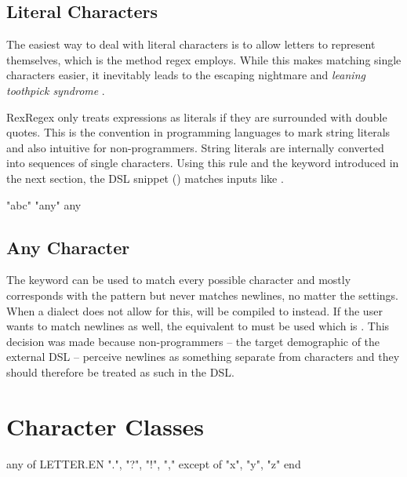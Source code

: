 \subsection{Literal Characters}

The easiest way to deal with literal characters is to allow letters to represent themselves, which is the method regex employs. While this makes matching single characters easier, it inevitably leads to the escaping nightmare and \emph{leaning toothpick syndrome} \cite{LeaningToothpick}. 

RexRegex only treats expressions as literals if they are surrounded with double quotes. This is the convention in programming languages to mark string literals and also intuitive for non-programmers. String literals are internally converted into sequences of single characters. Using this rule and the  keyword introduced in the next section, the DSL snippet () matches inputs like .

\vspace{5mm}
\begin{rexregexBox}[title={Literal characters in RexRegex},label=code:dslLiteralChars,width=9.5cm,center]
"abc"
"any"
any
\end{rexregexBox}

\subsection{Any Character}

The  keyword can be used to match every possible character and mostly corresponds with the  pattern but never matches newlines, no matter the settings. When a dialect does not allow for this,  will be compiled to \pattern{[\caret\bs n]} instead. If the user wants to match newlines as well, the equivalent to  must be used which is . This decision was made because non-programmers -- the target demographic of the external DSL -- perceive newlines as something separate from characters and they should therefore be treated as such in the DSL.

\section{Character Classes} \label{sec:dslCharClasses}

\begin{rexregexBox}[label=code:dslCharClasses,title=Character classes in RexRegex,width=9.5cm,center]
any of
    LETTER.EN
    ".", "?", "!", ","
except of
    "x", "y", "z"
end
\end{rexregexBox}

